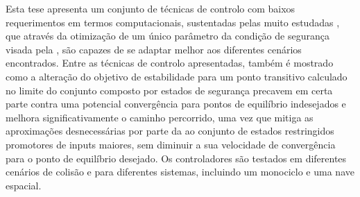 
%

Esta tese apresenta um conjunto de técnicas de controlo com baixos requerimentos em termos computacionais, sustentadas pelas muito estudadas , que através da otimização de um único parâmetro da condição de segurança visada pela , são capazes de se adaptar melhor aos diferentes cenários encontrados. Entre as técnicas de controlo apresentadas, também é mostrado como a alteração do objetivo de estabilidade para um ponto transitivo calculado no limite do conjunto composto por estados de segurança precavem em certa parte contra uma potencial convergência para pontos de equilíbrio indesejados e melhora significativamente o caminho percorrido, uma vez que mitiga as aproximações desnecessárias por parte da  ao conjunto de estados restringidos promotores de inputs maiores, sem diminuir a sua velocidade de convergência para o ponto de equilíbrio desejado. Os controladores são testados em diferentes cenários de colisão e para diferentes sistemas, incluindo um monociclo e uma nave espacial. 




